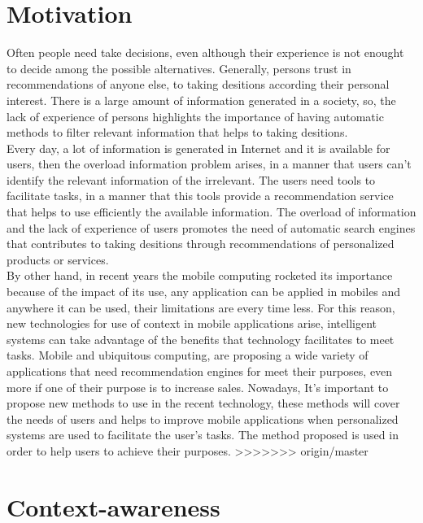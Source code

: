 \section{Motivation}

Often people need take decisions, even although their experience is
not enought to decide among the possible alternatives. Generally,
persons trust in recommendations of anyone else, to taking desitions
according their personal interest. There is a large amount of
information generated in a society, so, the lack of experience of
persons highlights the importance of having automatic methods to
filter relevant information that helps to taking desitions. \\Every day,
a lot of information is generated in Internet and it is available for
users, then the overload information problem arises, in a manner that
users can't identify the relevant information of the irrelevant. The
users need tools to facilitate tasks, in a manner that this tools
provide a recommendation service that helps to use efficiently the
available information. The overload of information and the lack of
experience of users promotes the need of automatic search engines
that contributes to taking desitions through recommendations of
personalized products or services. \\
By other hand, in recent years  the mobile computing rocketed its
importance because of the impact of its use, any application can be
applied in mobiles and anywhere it can be used, their limitations
are every time less. For this reason, new technologies for use of
context in mobile applications arise, intelligent systems can take
advantage of the benefits that technology facilitates to meet tasks.
Mobile and ubiquitous
computing\cite{noguera2012mobile},\cite{chiou2010adaptive} are
proposing a wide variety of applications that need recommendation
engines for meet their purposes, even more if one of their purpose 
is to increase sales.
Nowadays, It's important to propose new methods to use in the recent
technology, these methods will cover the needs of users and helps 
to improve mobile applications  when personalized systems are 
used to facilitate the user's tasks. The method proposed is used 
in order to help users to achieve their purposes.
>>>>>>> origin/master

\section{Context-awareness} \label{context-awareness}

